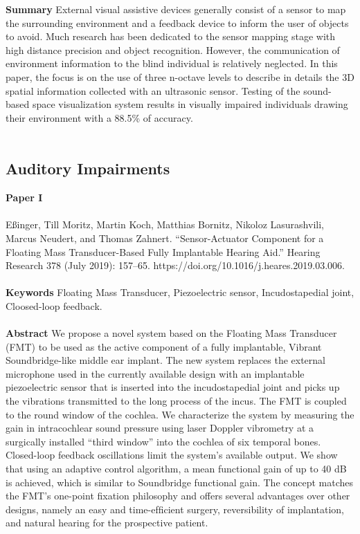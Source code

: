 \noindent
\textbf{Summary} External visual assistive devices generally consist of a sensor to map the surrounding environment and a feedback device to inform the user of objects to avoid. Much research has been dedicated to the sensor mapping stage with high distance precision and object recognition. However, the communication of environment information to the blind individual is relatively neglected. In this paper, the focus is on the use of three n-octave levels to describe in details the 3D spatial information collected with an ultrasonic sensor. Testing of the sound-based space visualization system results in visually impaired individuals drawing their environment with a 88.5\% of accuracy. \\ \\

\subsection{Auditory Impairments}

\textbf{Paper I} 
\\ \\
\noindent
Eßinger, Till Moritz, Martin Koch, Matthias Bornitz, Nikoloz Lasurashvili, Marcus Neudert, and Thomas Zahnert. “Sensor-Actuator Component for a Floating Mass Transducer-Based Fully Implantable Hearing Aid.” Hearing Research 378 (July 2019): 157–65. https://doi.org/10.1016/j.heares.2019.03.006. \\ \\

\noindent
\textbf{Keywords} Floating Mass Transducer, Piezoelectric sensor, Incudostapedial joint, Cloosed-loop feedback. \\ \\

\noindent
\textbf{Abstract} We propose a novel system based on the Floating Mass Transducer (FMT) to be used as the active component of a fully implantable, Vibrant Soundbridge-like middle ear implant. The new system replaces the external microphone used in the currently available design with an implantable piezoelectric sensor that is inserted into the incudostapedial joint and picks up the vibrations transmitted to the long process of the incus. The FMT is coupled to the round window of the cochlea. We characterize the system by measuring the gain in intracochlear sound pressure using laser Doppler vibrometry at a surgically installed “third window” into the cochlea of six temporal bones. Closed-loop feedback oscillations limit the system's available output. We show that using an adaptive control algorithm, a mean functional gain of up to 40 dB is achieved, which is similar to Soundbridge functional gain. The concept matches the FMT's one-point ﬁxation philosophy and offers several advantages over other designs, namely an easy and time-efﬁcient surgery, reversibility of implantation, and natural hearing for the prospective patient. \\ \\

